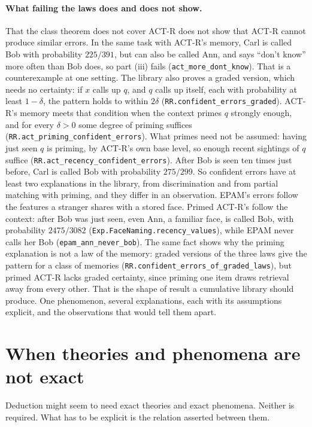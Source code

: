 \documentclass[11pt]{article}
\newcommand{\lean}[1]{\texttt{#1}}
\begin{document}
\paragraph{What failing the laws does and does not show.} That the class theorem does not cover ACT-R does not show that ACT-R cannot produce similar errors. In the same task with ACT-R's memory, Carl is called Bob with probability $225/391$, but can also be called Ann, and says ``don't know'' more often than Bob does, so part (iii) fails (\lean{act\_more\_dont\_know}). That is a counterexample at one setting. The library also proves a graded version, which needs no certainty: if $x$ calls up $q$, and $q$ calls up itself, each with probability at least $1-\delta$, the pattern holds to within $2\delta$ (\lean{RR.confident\_errors\_graded}). ACT-R's memory meets that condition when the context primes $q$ strongly enough, and for every $\delta>0$ some degree of priming suffices (\lean{RR.act\_priming\_confident\_errors}). What primes need not be assumed: having just seen $q$ is priming, by ACT-R's own base level, so enough recent sightings of $q$ suffice (\lean{RR.act\_recency\_confident\_errors}). After Bob is seen ten times just before, Carl is called Bob with probability $275/299$. So confident errors have at least two explanations in the library, from discrimination and from partial matching with priming, and they differ in an observation. EPAM's errors follow the features a stranger shares with a stored face. Primed ACT-R's follow the context: after Bob was just seen, even Ann, a familiar face, is called Bob, with probability $2475/3082$ (\lean{Exp.FaceNaming.recency\_values}), while EPAM never calls her Bob (\lean{epam\_ann\_never\_bob}). The same fact shows why the priming explanation is not a law of the memory: graded versions of the three laws give the pattern for a class of memories (\lean{RR.confident\_errors\_of\_graded\_laws}), but primed ACT-R lacks graded certainty, since priming one item draws retrieval away from every other. That is the shape of result a cumulative library should produce. One phenomenon, several explanations, each with its assumptions explicit, and the observations that would tell them apart.

\section{When theories and phenomena are not exact}
\label{sec:squishy}

Deduction might seem to need exact theories and exact phenomena. Neither is required. What has to be explicit is the relation asserted between them.
\end{document}
